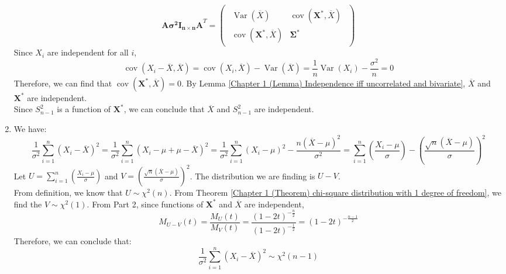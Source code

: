 \documentclass{huhtakm-template-book-v2}
\DeclareMathOperator{\Var}{Var}
\DeclareMathOperator{\cov}{cov}
\begin{document}
\begin{proofing}
\begin{enumerate}
		\begin{equation*}
			\mathbf{A\sigma^{2}I_{n\times n}A}^{T}=\begin{pmatrix}\begin{array}{c|c}
					\Var(\overline{X}) & \cov(\mathbf{X^{*}},\overline{X})\\
					\hline
					\cov(\mathbf{X^{*}},\overline{X}) & \mathbf{\Sigma^{*}}
			\end{array}\end{pmatrix}
		\end{equation*}
		Since $X_{i}$ are independent for all $i$,
		\begin{equation*}
			\cov(X_{i}-\overline{X},\overline{X})=\cov(X_{i},\overline{X})-\Var(\overline{X})=\frac{1}{n}\Var(X_{i})-\frac{\sigma^{2}}{n}=0
		\end{equation*}
		Therefore, we can find that $\cov(\mathbf{X^{*}},\overline{X})=0$. By Lemma \ref{Chapter 1 (Lemma) Independence iff uncorrelated and bivariate}, $\overline{X}$ and $\mathbf{X^{*}}$ are independent.\\
		Since $S_{n-1}^{2}$ is a function of $\mathbf{X^{*}}$, we can conclude that $\overline{X}$ and $S_{n-1}^{2}$ are independent.
		\item We have:
		\begin{equation*}
			\frac{1}{\sigma^{2}}\sum_{i=1}^{n}(X_{i}-\overline{X})^{2}=\frac{1}{\sigma^{2}}\sum_{i=1}^{n}(X_{i}-\mu+\mu-\overline{X})^{2}=\frac{1}{\sigma^{2}}\sum_{i=1}^{n}(X_{i}-\mu)^{2}-\frac{n(\overline{X}-\mu)^{2}}{\sigma^{2}}=\sum_{i=1}^{n}\left(\frac{X_{i}-\mu}{\sigma}\right)-\left(\frac{\sqrt{n}(\overline{X}-\mu)}{\sigma}\right)^{2}
		\end{equation*}
		Let $U=\sum_{i=1}^{n}\left(\frac{X_{i}-\mu}{\sigma}\right)$ and $V=\left(\frac{\sqrt{n}(\overline{X}-\mu)}{\sigma}\right)^{2}$. The distribution we are finding is $U-V$.\\
		From definition, we know that $U\sim\chi^{2}(n)$. From Theorem \ref{Chapter 1 (Theorem) chi-square distribution with 1 degree of freedom}, we find the $V\sim\chi^{2}(1)$. From Part 2, since functions of $\mathbf{X}^{*}$ and $\overline{X}$ are independent, 
		\begin{equation*}
			M_{U-V}(t)=\frac{M_{U}(t)}{M_{V}(t)}=\frac{(1-2t)^{-\frac{n}{2}}}{(1-2t)^{-\frac{1}{2}}}=(1-2t)^{-\frac{n-1}{2}}
		\end{equation*}
		Therefore, we can conclude that:
		\begin{equation*}
			\frac{1}{\sigma^{2}}\sum_{i=1}^{n}(X_{i}-\overline{X})^{2}\sim\chi^{2}(n-1)
		\end{equation*}
	\end{enumerate}
\end{proofing}
\end{document}

